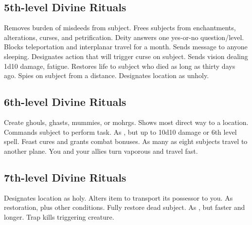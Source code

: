 \subsection{5th-level Divine Rituals}
\begin{rituallist}
    \F\M Removes burden of misdeeds from subject.
     Frees subjects from enchantments, alterations, curses, and petrification.
     Deity answers one yes-or-no question/level.
     Blocks teleportation and interplanar travel for a month.
     Sends message to anyone sleeping.
     Designates action that will trigger curse on subject.
     Sends vision dealing 1d10 damage, fatigue.
     Restores life to subject who died as long as thirty days ago.
    \F Spies on subject from a distance.
     Designates location as unholy.
\end{rituallist}

\subsection{6th-level Divine Rituals}
\begin{rituallist}
     Create ghouls, ghasts, mummies, or mohrgs.
     Shows most direct way to a location.
     Commands subject to perform task.
     As , but up to 10d10 damage or 6th level spell.
     Feast cures and grants combat bonuses.
    \F As many as eight subjects travel to another plane.
     You and your allies turn vaporous and travel fast.
\end{rituallist}

\subsection{7th-level Divine Rituals}
\begin{rituallist}
     Designates location as holy.
     Alters item to transport its possessor to you.
     As restoration, plus other conditions.
     Fully restore dead subject.
     As , but faster and longer.
     Trap kills triggering creature.
\end{rituallist}

